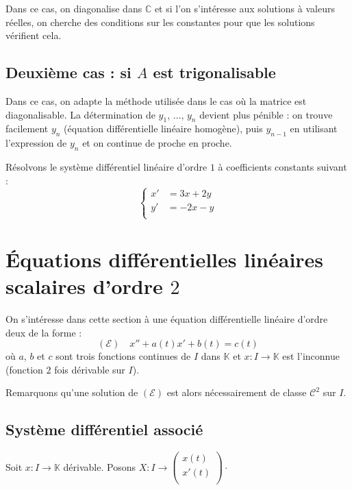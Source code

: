 \documentclass[french,11pt,twoside]{VcCours}
\begin{document}
Dans ce cas, on diagonalise dans $\mathbb{C}$ et si l'on s'intéresse aux solutions à valeurs réelles, on cherche des conditions sur les constantes pour que les solutions vérifient cela.

\subsection{Deuxième cas : si \texorpdfstring{$A$}{A} est trigonalisable}

Dans ce cas, on adapte la méthode utilisée dans le cas où la matrice est diagonalisable. La détermination de $y_1$, $\ldots$, $y_n$ devient plus pénible : on trouve facilement $y_n$ (équation différentielle linéaire homogène), puis $y_{n-1}$ en utilisant l'expression de $y_n$ et on continue de proche en proche. 



\begin{Exemple} Résolvons le système différentiel linéaire d'ordre $1$ à coefficients constants suivant : 
$$ \left\lbrace \begin{array}{lll}
    x' & = 3x + 2y \\
    y' & = -2x - y \\
    \end{array}\right.$$
\end{Exemple}

\vspace*{10cm}

\vspace*{10cm}


\section{Équations différentielles linéaires scalaires d'ordre \texorpdfstring{$2$}{2}}

On s'intéresse dans cette section à une équation différentielle linéaire d'ordre deux de la forme :
$$ (\mathcal{E}) \quad x''+a(t)x'+b(t)=c(t)$$
où $a$, $b$ et $c$ sont trois fonctions continues de $I$ dans $\mathbb{K}$ et $x : I \rightarrow \mathbb{K}$ est l'inconnue (fonction $2$ fois dérivable sur $I$).



Remarquons qu'une solution de $(\mathcal{E})$ est alors nécessairement de classe $\mathcal{C}^2$ sur $I$.


\subsection{Système différentiel associé}
Soit $x : I \rightarrow \mathbb{K}$ dérivable. Posons $X : I \rightarrow \begin{pmatrix}
x(t) \\
x'(t) \\
\end{pmatrix} \cdot$
\end{document}
